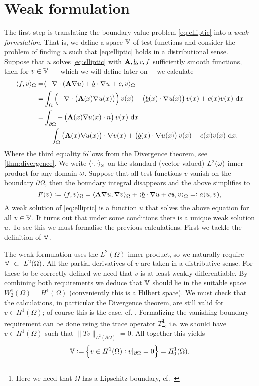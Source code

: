 \documentclass[thesis.tex]{subfiles}
\begin{document}
\section{Weak formulation}
The first step is translating the boundary value problem \eqref{eq:elliptic} into a \emph{weak formulation}.  
That is, we define a space $\mathbb{V}$ of test functions and consider the problem of finding $u$ such that \eqref{eq:elliptic} holds 
in a distributional sense. Suppose that $u$ solves \eqref{eq:elliptic} with $\mathbf{A}, \underline{b}, c, f$ sufficiently smooth functions, then for $v \in \mathbb{V}$ --- which we will define later on--- we calculate
\begin{align*}
  \ip{f,v}_{\O} = &\ip{-\nabla \cdot {\left(\mathbf{A} \nabla u\right)} + \v{b} \cdot \nabla u + c, v}_{\O} \\
  = &\int_\Omega \left( -\nabla \cdot {\left(\mathbf{A}(x) \nabla u(x)\right)}\right)v(x) + \left(\v{b}(x) \cdot \nabla u(x)\right)v(x) + c(x) v(x) \, \dif x\\
  = &\int_{\partial \Omega} -\left(\mathbf{A}(x) \nabla u(x) \cdot n\right)v(x) \, \dif x \\
  &+ \int_{\Omega} \left( \mathbf{A}(x) \nabla u(x)\right) \cdot \nabla v(x) + \left(\v{b}(x) \cdot \nabla u(x)\right)v(x) + c(x) v(x) \, \dif x.
\end{align*}
Where the third equality follows from the Divergence theorem, see \ref{thm:divergence}. We write $\langle \cdot, \cdot \rangle_{\omega}$ on
the standard (vector-valued) $L^2(\omega)$ inner product for any domain $\omega$. Suppose that all test functions $v$ vanish on the boundary $\partial \Omega$, then the boundary integral disappears and the above simplifies to
\begin{equation}
  \label{eq:ellipticweak}
  F(v) := \langle f,v \rangle_\Omega = \langle \mathbf{A} \nabla u, \nabla v \rangle_\Omega + \langle \underline{b} \cdot \nabla u + cu, v \rangle_\Omega=: a(u,v),
\end{equation}
A weak solution of \eqref{eq:elliptic} is a function $u$ that solves the above equation for all $v \in \mathbb{V}$.
It turns out that under some conditions there is a unique weak solution $u$. To see this
we must formalise the previous calculations. First we tackle the definition of $\mathbb{V}$.

The weak formulation uses the $L^2(\Omega)$-inner product, so we naturally require~$\mathbb{V}~\subset~L^2(\Omega)$.
All the partial derivatives of $v$ are taken in a distributive sense.
For these to be correctly defined we need that $v$ is at least weakly differentiable.
By combining both requirements we deduce that $\mathbb{V}$ should lie in the suitable space 
$W_2^1(\Omega) = H^1(\Omega)$ (conveniently this is a Hilbert space).
We must check that the calculations, in particular the Divergence theorem, are still valid for $v \in H^1(\Omega)$;
of course this is the case, cf. \cite[Ch. 5]{brenner}.
Formalizing the vanishing boundary requirement can be done using the trace operator $T$\footnote{Here we need that $\Omega$ has a Lipschitz boundary, cf. \cite[Ch. 1.6]{brenner}.},
i.e. we should have $v \in H^1(\Omega)$ such that $\|Tv\|_{L^2(\partial \Omega)} = 0$. All together this yields
\[
  \mathbb{V} := \set{v \in H^1(\Omega): v|_{\partial \Omega} = 0} = H_0^1(\Omega).
\]
\end{document}
